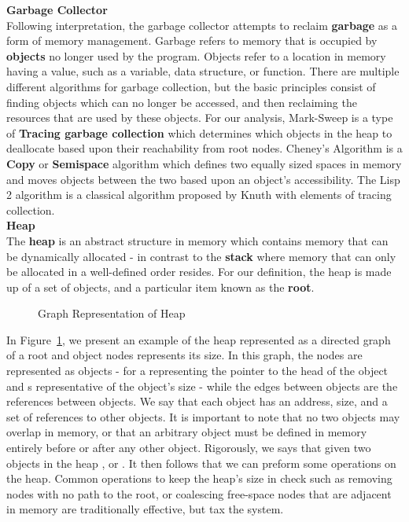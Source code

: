 \documentclass[11pt,leqno]{article}
\newcommand{\mydef}[1]{\textbf{#1}}
\begin{document}
\textbf{Garbage Collector}\\
Following interpretation, the garbage collector attempts to reclaim \mydef{garbage} as a form of memory management. Garbage refers to memory that is occupied by \mydef{objects} no longer used by the program. Objects refer to a location in memory having a value, such as a variable, data structure, or function. There are multiple different algorithms for garbage collection, but the basic principles consist of finding objects which can no longer be accessed, and then reclaiming the resources that are used by these objects. For our analysis, Mark-Sweep is a type of \mydef{Tracing garbage collection} which determines which objects in the heap to deallocate based upon their reachability from root nodes. Cheney's Algorithm is a \mydef{Copy} or \mydef{Semispace} algorithm which defines two equally sized spaces in memory and moves objects between the two based upon an object's accessibility. The Lisp 2 algorithm is a classical algorithm proposed by Knuth with elements of tracing collection.\\

\noindent
\textbf{Heap}\\
The \mydef{heap} is an abstract structure in memory which contains memory that can be dynamically allocated - in contrast to the \mydef{stack} where memory that can only be allocated in a well-defined order resides. For our definition, the heap is made up of a set of objects, and a particular item known as the \mydef{root}. 

\begin{figure}[H]
	\centering
	\caption{Graph Representation of Heap}
	\label{fig:heapex}
\end{figure}

In Figure~\ref{fig:heapex}, we present an example of the heap represented as a directed graph of a root and object nodes represents its size. In this graph, the nodes are represented as objects  - for a representing the pointer to the head of the object and s representative of the object's size - while the edges between objects are the references between objects. We say that each object has an address, size, and a set of references to other objects. It is important to note that no two objects may overlap in memory, or that an arbitrary object must be defined in memory entirely before or after any other object. Rigorously, we says that given two objects in the heap ,  or . It then follows that we can preform some operations on the heap. Common operations to keep the heap's size in check such as removing nodes with no path to the root, or coalescing free-space nodes that are adjacent in memory are traditionally effective, but tax the system.
    
\end{document}
